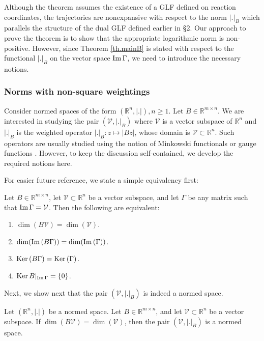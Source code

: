 \documentclass[onefignum,onetabnum]{siamonline220329}
\newcommand{\cV}{{\mathcal{V}}}
\renewcommand{\Im}{{\mathop{\rm Im\,}}}
\renewcommand{\ker}{{\mathop{\rm Ker\,}}}
\newcommand{\Imgamma}{\Im \Gamma}
\begin{document}
{\begin{theorem}
\end{theorem}

{Although the theorem assumes the existence of a GLF defined on reaction coordinates, the trajectories are nonexpansive with respect to the norm $|.|_B$ which parallels the structure of the dual GLF defined earlier in \S 2.}
Our approach to prove the theorem is to show that the appropriate logarithmic norm is non-positive. However, since Theorem \ref{th.mainB} is stated with respect to the functional $|.|_B$ on the vector space $\Imgamma$, we need to introduce the necessary notions.

\subsubsection{Norms with non-square weightings}
 	{Consider normed spaces of the form $(\mathbb R^n,|.|), n\ge 1$}. Let $B\in\mathbb R^{m\times n}$. We are interested in studying the pair $(\cV,|.|_B)$ where $\cV$ is  a vector subspace of $\mathbb R^n$ and $|.|_B$ is the weighted operator $|.|_B: z\mapsto |Bz| ${, whose domain is $\mathbb \cV \subset \mathbb R^n$}. Such operators are usually studied using the notion of Minkowski functionals or gauge functions \cite{thompson96}. However, to keep the discussion self-contained, we develop the required notions here. %
    
    
    For easier future reference, we state a simple equivalency first:
 	\begin{lemma}\label{lem.linalg}
 Let $B\in\mathbb R^{m\times n}$, let $\cV\subset \mathbb R^n$ be a vector subspace, and let $\Gamma$ be any matrix such that $\Imgamma=\cV$. Then the following are equivalent:
 \begin{enumerate}
 	\item ${\dim}(B\cV)={\dim}(\cV)$.
 	\item ${\dim}(\Im(B\Gamma))={\dim}(\Im(\Gamma))$.
 	\item $\ker(B\Gamma)=\ker(\Gamma)$.
 	\item $\ker B|_{\Imgamma}=\{0\}$.
 \end{enumerate}
 \end{lemma}
 
Next, we show next that the pair $(\cV,|.|_B)$ is indeed a normed space.
\begin{lemma}\label{lem.normB}
Let $(\mathbb R^n,|.|)$ be a normed space. Let $B\in\mathbb R^{m\times n}$, and let $\cV\subset \mathbb R^n$ be a vector subspace. If ${\dim}(B\cV)={\dim}(\cV)$, then the pair $(\cV,|.|_B)$ is a normed space.
\end{lemma}
 
}
\end{document}
